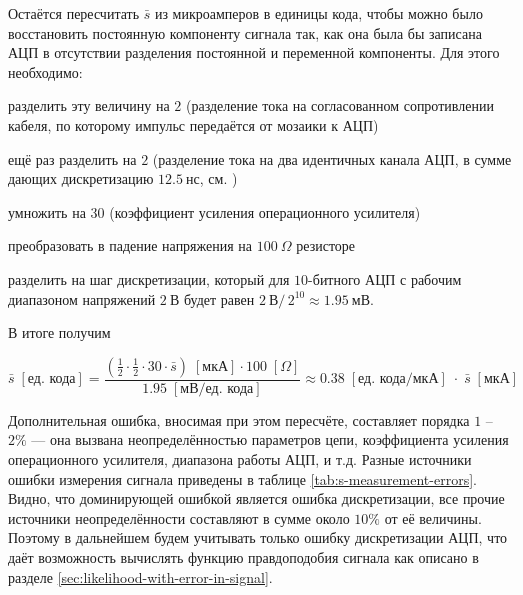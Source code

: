 Остаётся пересчитать $\bar{s}$ из микроамперов в единицы кода, чтобы можно было восстановить постоянную компоненту сигнала так, как она была бы записана АЦП в отсутствии разделения постоянной и переменной компоненты. Для этого необходимо:
\begin{enumerate*}[label=\arabic*)]
	\item разделить эту величину на $2$ (разделение тока на согласованном сопротивлении кабеля, по которому импульс передаётся от мозаики к АЦП)
	\item ещё раз разделить на $2$ (разделение тока на два идентичных канала АЦП, в сумме дающих дискретизацию $12.5~\text{нс}$, см. \cite{SphereDetector2020})
	\item умножить на $30$ (коэффициент усиления операционного усилителя)
	\item преобразовать в падение напряжения на $100~\Omega$ резисторе
	\item разделить на шаг дискретизации, который для $10$-битного АЦП с рабочим диапазоном напряжений $2~\text{В}$ будет равен $2~\text{В} / \, 2^{10} \approx 1.95~\text{мВ}$.
\end{enumerate*}
В итоге получим

\begin{equation}
	\label{eq:current-muA-to-code-units-conversion}
	\bar{s} \; [\text{ед. кода}] = \frac{\left(\frac{1}{2} \cdot \frac{1}{2} \cdot 30 \cdot \bar{s} \right) \; [ \text{мкА}] \cdot 100 \; [\Omega]}{1.95 \; [\text{мВ} / \text{ед. кода}]} \approx 0.38 \; [\text{ед. кода} / \text{мкА}] \;\cdot\; \bar{s} \; [\text{мкА}]
\end{equation}

Дополнительная ошибка, вносимая при этом пересчёте, составляет порядка $1$ -- $2\%$ --- она вызвана неопределённостью параметров цепи, коэффициента усиления операционного усилителя, диапазона работы АЦП, и т.д. Разные источники ошибки измерения сигнала приведены в таблице \ref{tab:s-measurement-errors}. Видно, что доминирующей ошибкой является ошибка дискретизации, все прочие источники неопределённости составляют в сумме около $10\%$ от её величины. Поэтому в дальнейшем будем учитывать только ошибку дискретизации АЦП, что даёт возможность вычислять функцию правдоподобия сигнала как описано в разделе \ref{sec:likelihood-with-error-in-signal}.

